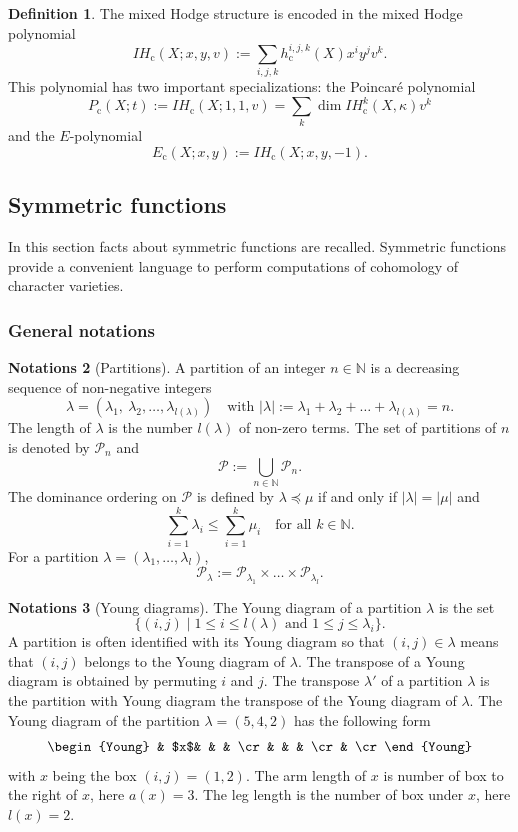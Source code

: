 \documentclass[11pt]{article}
\newcommand{\Subsubsection}{\subsubsection}
\newcommand{\rc}{\mathrm{c}}
\theoremstyle{definition}
\newtheorem{definition}{Definition}[section]
\newtheorem{notations}[definition]{Notations}
\theoremstyle{plain}
\newcommand{\IH}{\mathit{IH}}
\newcommand{\NN}{\mathbb N}
\newcommand{\Part}{\mathcal{P}}
\begin{document}
\begin{definition}\label{def_polynomial_coho}
The mixed Hodge structure is encoded in the mixed Hodge polynomial
\begin{equation}
\IH_{\rc}(X;x,y,v):=\sum_{i,j,k} h_\rc^{i,j,k}(X) x^i y^j v^k.
\end{equation}
This polynomial has two important specializations: the Poincaré polynomial
\begin{equation}
P_{\rc}(X;t):=\IH_{\rc}(X;1,1,v)=\sum_k \dim \IH_{\rc}^k(X,\kappa) v^k
\end{equation}
and the $E$-polynomial
\begin{equation}
E_\rc (X;x,y):=\IH_{\rc} (X;x,y,-1).
\end{equation}
\end{definition}

\subsection{Symmetric functions}
In this section facts about symmetric functions are recalled. Symmetric functions provide a convenient language to perform computations of cohomology of character varieties.
\Subsubsection{General notations}
\begin{notations}[Partitions]\label{notations_partitions}
A partition of an integer $n\in\NN$ is a decreasing sequence of non-negative integers
\[
\lambda=(\lambda_1,\ \lambda_2,\dots, \lambda_{l(\lambda)}) \quad\text{with } |\lambda|:=\lambda_1+\lambda_2+\dots+\lambda_{l(\lambda)}=n.
\]
The length of $\lambda$ is the number $l(\lambda)$ of non-zero terms. The set of partitions of $n$ is denoted by $\Part_n$ and
\[
\Part:=\bigcup_{n\in\NN } \Part_n.
\]
The dominance ordering on $\Part$ is defined by $\lambda \preceq \mu$ if and only if
$|\lambda|=|\mu|$ and
\[
\sum_{i=1}^{k}\lambda_i \le \sum_{i=1}^{k}\mu_i \quad\text{for all } k\in \NN.
\]
For a partition $\lambda=(\lambda_1,\dots,\lambda_l)$,
\[
\Part_{\lambda} := \Part_{\lambda_1}\times\dots\times \Part_{\lambda_l}.
\]
\end{notations}
\begin{notations}[Young diagrams]\label{notations_young}
The Young diagram of a partition $\lambda$ is the set
\[
\lbrace (i,j) \mid 1\le i \le l(\lambda) \text{ and } 1 \le j \le \lambda_i\rbrace.
\]
A partition is often identified with its Young diagram so that $(i,j)\in \lambda$ means that $(i,j)$ belongs to the Young diagram of $\lambda$. The transpose of a Young diagram is obtained by permuting $i$ and $j$. The transpose $\lambda'$ of a partition $\lambda$ is the partition with Young diagram the transpose of the Young diagram of $\lambda$. The Young diagram of the partition $\lambda=(5,4,2)$ has the following form
\[
\begin{Young}
& $x$& & & \cr
& & & \cr
& \cr
\end{Young}
\]
with $x$ being the box $(i,j)=(1,2)$. The arm length of $x$ is number of box to the right of $x$, here $a(x)=3$. The leg length is the number of box under $x$, here $l(x)=2$.
\end{notations}
\end{document}
